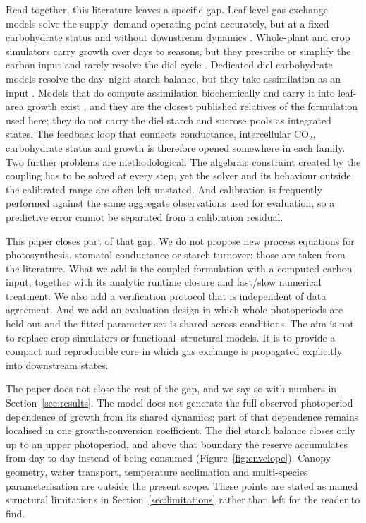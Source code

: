 Read together, this literature leaves a specific gap. Leaf-level gas-exchange
models solve the supply--demand operating point accurately, but at a fixed
carbohydrate status and without downstream dynamics
\cite{Farquhar1980,Jarvis1976,vonCaemmerer2000}. Whole-plant and crop
simulators carry growth over days to seasons, but they prescribe or simplify
the carbon input and rarely resolve the diel cycle
\cite{Jones2003,deWit2019,Holzworth2014}. Dedicated diel carbohydrate models
resolve the day--night starch balance, but they take assimilation as an input
\cite{Scialdone2013,Graf2010}. Models that do compute assimilation
biochemically and carry it into leaf-area growth exist
\cite{Weraduwage2015}, and they are the closest published relatives of the
formulation used here; they do not carry the diel starch and sucrose pools as
integrated states. The feedback loop that connects conductance,
intercellular CO$_2$, carbohydrate status and growth is therefore opened
somewhere in each family. Two further problems are methodological. The
algebraic constraint created by the coupling has to be solved at every step,
yet the solver and its behaviour outside the calibrated range are often left
unstated. And calibration is frequently performed against the same aggregate
observations used for evaluation, so a predictive error cannot be separated
from a calibration residual.

This paper closes part of that gap. We do not propose new process equations for
photosynthesis, stomatal conductance or starch turnover; those are taken from
the literature. What we add is the coupled formulation with a computed carbon
input, together with its analytic runtime closure and fast/slow numerical
treatment. We also add a verification protocol that is independent of data
agreement. And we add an evaluation design in which whole photoperiods are held
out and the fitted parameter set is shared across conditions. The aim is not to replace crop simulators or
functional--structural models. It is to provide a compact and reproducible core
in which gas exchange is propagated explicitly into downstream states.

The paper does not close the rest of the gap, and we say so with numbers in
Section~\ref{sec:results}. The model does not generate the full observed
photoperiod dependence of growth from its shared dynamics; part of that
dependence remains localised in one growth-conversion coefficient. The diel
starch balance closes only up to an upper photoperiod, and above that boundary
the reserve accumulates from day to day instead of being consumed
(Figure~\ref{fig:envelope}). Canopy geometry, water transport, temperature
acclimation and multi-species parameterisation are outside the present scope.
These points are stated as named structural limitations in
Section~\ref{sec:limitations} rather than left for the reader to find.

